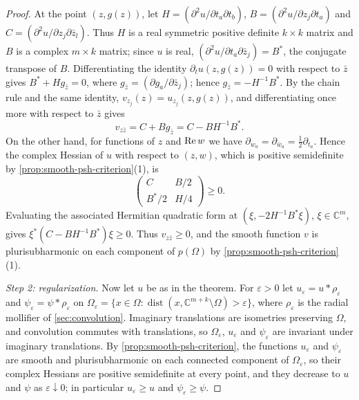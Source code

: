 \begin{proof}
At the point $(z,g(z))$, let $H=(\partial^2u/\partial t_a\partial t_b)$, $B=(\partial^2u/\partial z_j\partial t_a)$ and $C=(\partial^2u/\partial z_j\partial\bar z_l)$. Thus $H$ is a real symmetric positive definite $k\times k$ matrix and $B$ is a complex $m\times k$ matrix; since $u$ is real, $(\partial^2u/\partial t_a\partial\bar z_j)=B^*$, the conjugate transpose of $B$. Differentiating the identity $\partial_tu(z,g(z))=0$ with respect to $\bar z$ gives $B^*+Hg_{\bar z}=0$, where $g_{\bar z}=(\partial g_a/\partial\bar z_j)$; hence $g_{\bar z}=-H^{-1}B^*$. By the chain rule and the same identity, $v_{z_j}(z)=u_{z_j}(z,g(z))$, and differentiating once more with respect to $\bar z$ gives
\[
 v_{z\bar z}=C+Bg_{\bar z}=C-BH^{-1}B^*.
\]
On the other hand, for functions of $z$ and $\operatorname{Re} w$ we have $\partial_{w_a}=\partial_{\bar w_a}=\frac12\partial_{t_a}$. Hence the complex Hessian of $u$ with respect to $(z,w)$, which is positive semidefinite by \cref{prop:smooth-psh-criterion}(1), is
\[
 \begin{pmatrix} C&B/2\\ B^*/2&H/4\end{pmatrix}\ge0.
\]
Evaluating the associated Hermitian quadratic form at $(\xi,-2H^{-1}B^*\xi)$, $\xi\in\mathbb{C}^m$, gives $\xi^*(C-BH^{-1}B^*)\xi\geq0$. Thus $v_{z\bar z}\geq0$, and the smooth function $v$ is plurisubharmonic on each component of $p(\Omega)$ by \cref{prop:smooth-psh-criterion}(1).

\emph{Step 2: regularization.} Now let $u$ be as in the theorem. For $\varepsilon>0$ let $u_\varepsilon=u*\rho_\varepsilon$ and $\psi_\varepsilon=\psi*\rho_\varepsilon$ on $\Omega_\varepsilon=\{x\in\Omega:\operatorname{dist}(x,\mathbb{C}^{m+k}\setminus\Omega)>\varepsilon\}$, where $\rho_\varepsilon$ is the radial mollifier of \cref{sec:convolution}. Imaginary translations are isometries preserving $\Omega$, and convolution commutes with translations, so $\Omega_\varepsilon$, $u_\varepsilon$ and $\psi_\varepsilon$ are invariant under imaginary translations. By \cref{prop:smooth-psh-criterion}, the functions $u_\varepsilon$ and $\psi_\varepsilon$ are smooth and plurisubharmonic on each connected component of $\Omega_\varepsilon$, so their complex Hessians are positive semidefinite at every point, and they decrease to $u$ and $\psi$ as $\varepsilon\downarrow0$; in particular $u_\varepsilon\geq u$ and $\psi_\varepsilon\geq\psi$.


\end{proof}
